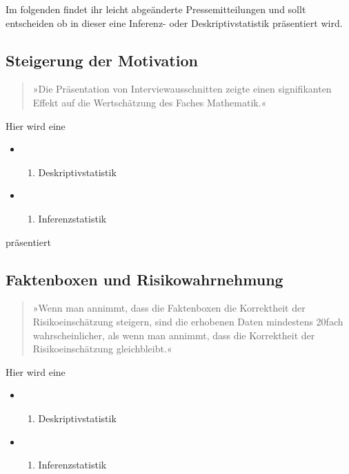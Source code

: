 \documentclass[
  letterpaper,
  DIV=11]{scrreprt}
\providecommand{\tightlist}{%
  \setlength{\itemsep}{0pt}\setlength{\parskip}{0pt}}\usepackage{longtable,booktabs,array}
\begin{document}
Im folgenden findet ihr leicht abgeänderte Pressemitteilungen und sollt
entscheiden ob in dieser eine Inferenz- oder Deskriptivstatistik
präsentiert wird.

\subsection*{Steigerung der Motivation}\label{steigerung-der-motivation}

\begin{quote}
»Die Präsentation von Interviewausschnitten zeigte einen signifikanten
Effekt auf die Wertschätzung des Faches Mathematik.«
\end{quote}

Hier wird eine

\begin{itemize}
\item
  \begin{enumerate}
  \def\labelenumi{(\Alph{enumi})}
  \tightlist
  \item
    Deskriptivstatistik\\
  \end{enumerate}
\item
  \begin{enumerate}
  \def\labelenumi{(\Alph{enumi})}
  \setcounter{enumi}{1}
  \tightlist
  \item
    Inferenzstatistik
  \end{enumerate}
\end{itemize}

präsentiert

\subsection*{Faktenboxen und
Risikowahrnehmung}\label{faktenboxen-und-risikowahrnehmung}

\begin{quote}
»Wenn man annimmt, dass die Faktenboxen die Korrektheit der
Risikoeinschätzung steigern, sind die erhobenen Daten mindestens 20fach
wahrscheinlicher, als wenn man annimmt, dass die Korrektheit der
Risikoeinschätzung gleichbleibt.«
\end{quote}

Hier wird eine

\begin{itemize}
\item
  \begin{enumerate}
  \def\labelenumi{(\Alph{enumi})}
  \tightlist
  \item
    Deskriptivstatistik\\
  \end{enumerate}
\item
  \begin{enumerate}
  \def\labelenumi{(\Alph{enumi})}
  \setcounter{enumi}{1}
  \tightlist
  \item
    Inferenzstatistik
  \end{enumerate}
\end{itemize}
\end{document}
